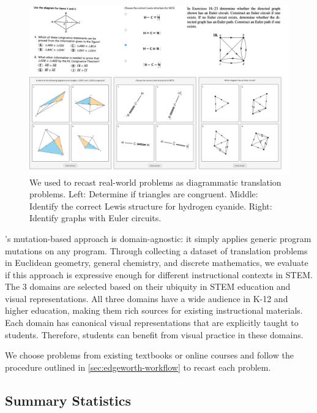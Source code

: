 \begin{figure}[h]
    \centering
    \includegraphics[width=\linewidth]{assets/chapter-3/problem-samples.pdf}
    \caption{We used \Edgeworth to recast real-world problems as diagrammatic translation problems. Left: \textmd{Determine if triangles are congruent.}  Middle: \textmd{Identify the correct Lewis structure for hydrogen cyanide.} Right: \textmd{Identify graphs with Euler circuits.}}
    \label{fig:edgeworth-problems}
\end{figure}


\Edgeworth's mutation-based approach is domain-agnostic: it simply applies generic program mutations on any \Substance program. Through collecting a dataset of translation problems in Euclidean geometry, general chemistry, and discrete mathematics, we evaluate if this approach is expressive enough for different instructional contexts in STEM. The 3 domains are selected based on their ubiquity in STEM education and visual representations. All three domains have a wide audience in K-12 and higher education, making them rich sources for existing instructional materials. Each domain has canonical visual representations that are explicitly taught to students. Therefore, students can benefit from visual practice in these domains.

We choose problems from existing textbooks or online courses and follow the procedure outlined in \cref{sec:edgeworth-workflow} to recast each problem. 


\subsection{Summary Statistics}
\label{sec:edgeworth-case-studies-summary}

